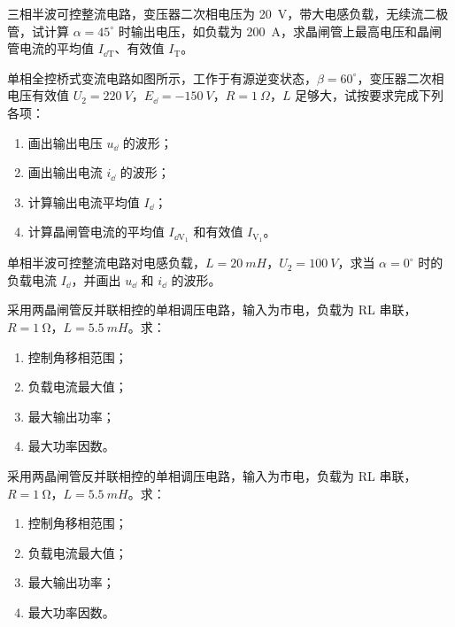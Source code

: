 \documentclass[电力电子]{subfiles}
\begin{document}
\begin{ti}[10 分]
	三相半波可控整流电路，变压器二次相电压为 \SI{20}{V}，带大电感负载，无续流二极管，试计算 $\alpha = 45^\circ$ 时输出电压，如负载为 \SI{200}{A}，求晶闸管上最高电压和晶闸管电流的平均值 $I_{\dd \mathrm{T}}$、有效值 $I_{\mathrm{T}}$。
\end{ti}

\begin{ti}[15 分]
	单相全控桥式变流电路如图所示，工作于有源逆变状态，$\beta = 60^\circ$，变压器二次相电压有效值 $U_{2} = \SI{220}{V}$，$E_{\dd} = - \SI{150}{V}$，$R = \SI{1}{\Omega}$，$L$ 足够大，试按要求完成下列各项：
	\begin{enumerate}
		\item 画出输出电压 $u_{\dd}$ 的波形；
		\item 画出输出电流 $i_{\dd}$ 的波形；
		\item 计算输出电流平均值 $I_{\dd}$；
		\item 计算晶闸管电流的平均值 $I_{\dd \mathrm{V}_{1}}$ 和有效值 $I_{\mathrm{V}_{1}}$。
	\end{enumerate}
\end{ti}

\begin{ti}[15 分]
	单相半波可控整流电路对电感负载，$L = \SI{20}{mH}$，$U_{2} = \SI{100}{V}$，求当 $\alpha = 0^\circ$ 时的负载电流 $I_{\dd}$，并画出 $u_{\dd}$ 和 $i_{\dd}$ 的波形。
\end{ti}

\begin{ti}[10 分]
	采用两晶闸管反并联相控的单相调压电路，输入为市电，负载为 RL 串联，$R = \SI{1}{\ohm}$，$L = \SI{5.5}{mH}$。求：
	\begin{enumerate}
		\item 控制角移相范围；
		\item 负载电流最大值；
		\item 最大输出功率；
		\item 最大功率因数。
	\end{enumerate}
\end{ti}

\begin{ti}[10 分]
	采用两晶闸管反并联相控的单相调压电路，输入为市电，负载为 RL 串联，$R = \SI{1}{\ohm}$，$L = \SI{5.5}{mH}$。求：
	\begin{enumerate}
		\item 控制角移相范围；
		\item 负载电流最大值；
		\item 最大输出功率；
		\item 最大功率因数。
	\end{enumerate}
\end{ti}
\end{document}
